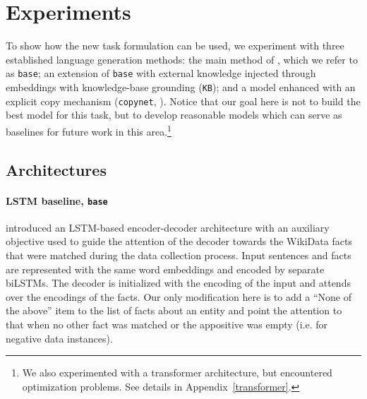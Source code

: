 \documentclass[11pt]{article}
\newcommand{\dltodo}[1]{\todo[color=yellow!20]{#1}}
\newcommand{\jttodo}[1]{\todo[color=blue!20]{#1}}
\begin{document}
\section{Experiments}
\label{sec:experiments}


To show how the new task formulation can be used,  
we experiment with three established language generation methods: the main method of , which we refer to as \texttt{base}; an extension of \texttt{base}  with external knowledge injected through embeddings with knowledge-base grounding (\texttt{KB}); and a model enhanced with an explicit copy mechanism (\texttt{copynet}, ). Notice that our goal here is not to build the best model for this task, but to develop reasonable models which can serve as baselines for future work in this area.\footnote{We also experimented with a transformer architecture, but encountered optimization problems. See details in Appendix~\ref{transformer}.}


\subsection{Architectures}
\paragraph{LSTM baseline, \texttt{base}}
 introduced an LSTM-based encoder-decoder architecture with an auxiliary objective used to guide the attention of the decoder towards the WikiData facts that were matched during the data collection process. Input sentences and facts are represented with the same word embeddings and encoded by separate biLSTMs. The decoder is initialized with the encoding of the input and attends over the encodings of the facts. Our only modification here is to add a ``None of the above'' item to the list of facts about an entity and point the attention to that when no other fact was matched or the appositive was empty (i.e. for negative data instances).
\end{document}
